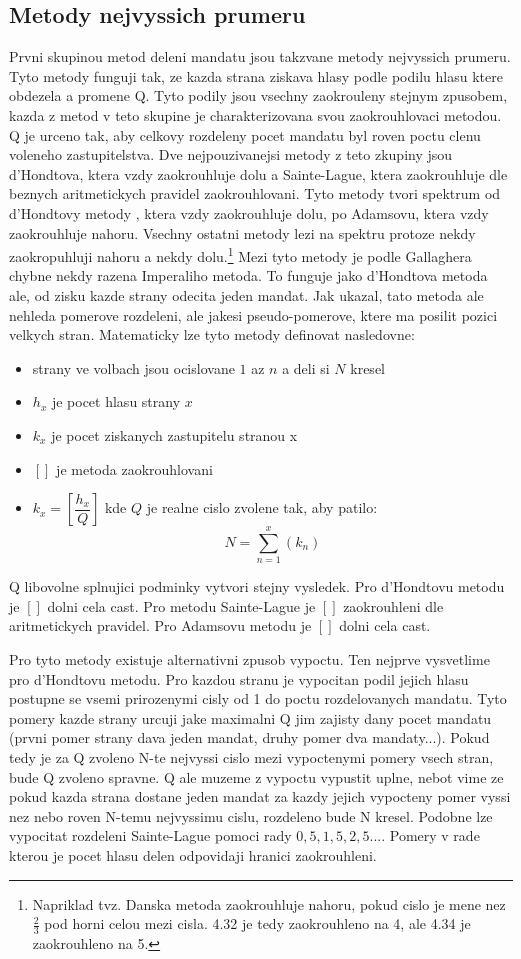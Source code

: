 \documentclass[12pt,a4paper]{scrreprt}
\begin{document}
\subsection{Metody nejvyssich prumeru}
Prvni skupinou metod deleni mandatu jsou takzvane metody nejvyssich prumeru.
Tyto metody funguji tak, ze kazda strana ziskava hlasy podle podilu hlasu ktere obdezela a promene Q.
Tyto podily jsou vsechny zaokrouleny stejnym zpusobem, kazda z metod v teto skupine je charakterizovana svou zaokrouhlovaci metodou.
Q je urceno tak, aby celkovy rozdeleny pocet mandatu byl roven poctu clenu voleneho zastupitelstva.
Dve nejpouzivanejsi metody z teto zkupiny jsou d'Hondtova, ktera vzdy zaokrouhluje dolu a Sainte-Lague, ktera zaokrouhluje dle beznych aritmetickych pravidel zaokrouhlovani.
Tyto metody tvori spektrum od d'Hondtovy metody , ktera vzdy zaokrouhluje dolu, po Adamsovu, ktera vzdy zaokrouhluje nahoru.
Vsechny ostatni metody lezi na spektru protoze nekdy zaokropuhluji nahoru a nekdy dolu.\footnote{Napriklad tvz. Danska metoda zaokrouhluje nahoru, pokud cislo je mene nez $\frac{2}{3}$ pod horni celou mezi cisla. 4.32 je tedy zaokrouhleno na 4, ale 4.34 je zaokrouhleno na 5.} 
Mezi tyto metody je podle Gallaghera chybne nekdy razena Imperaliho metoda.
To funguje jako d'Hondtova metoda ale, od zisku kazde strany odecita jeden mandat.
Jak ukazal, tato metoda ale nehleda pomerove rozdeleni, ale jakesi pseudo-pomerove, ktere ma posilit pozici velkych stran.
\autocite{GAL1}
\newpage
Matematicky lze tyto metody definovat nasledovne:
\begin{itemize}
\item strany ve volbach jsou ocislovane $1$ az $n$ a deli si $N$ kresel
\item $h_{x}$ je pocet hlasu strany $x$
\item $k_{x}$ je pocet ziskanych zastupitelu stranou x
\item $[ ]$ je metoda zaokrouhlovani
\item $k_{x}=[\dfrac{h_{x}}{Q}]$ kde $Q$ je realne cislo zvolene tak, aby patilo: $$N=\sum_{n=1}^{x} (k_{n})$$
\end{itemize}
Q libovolne splnujici podminky vytvori stejny vysledek.
Pro d'Hondtovu metodu je $[ ]$ dolni cela cast.
Pro metodu Sainte-Lague je $[ ]$ zaokrouhleni dle aritmetickych pravidel.
Pro Adamsovu metodu je $[ ]$ dolni cela cast.

Pro tyto metody existuje alternativni zpusob vypoctu.
Ten nejprve vysvetlime pro d'Hondtovu metodu.
Pro kazdou stranu je vypocitan podil jejich hlasu postupne se vsemi prirozenymi cisly od 1 do poctu rozdelovanych mandatu.
Tyto pomery kazde strany urcuji jake maximalni Q jim zajisty dany pocet mandatu (prvni pomer strany dava jeden mandat, druhy pomer dva mandaty...).
Pokud tedy je za Q zvoleno N-te nejvyssi cislo mezi vypoctenymi pomery vsech stran, bude Q zvoleno spravne.
Q ale muzeme z vypoctu vypustit uplne, nebot vime ze pokud kazda strana dostane jeden mandat za kazdy jejich vypocteny pomer vyssi nez nebo roven N-temu nejvyssimu cislu, rozdeleno bude N kresel.
Podobne lze vypocitat rozdeleni Sainte-Lague pomoci rady $0{,}5, 1{,}5, 2{,}5...$.
Pomery v rade kterou je pocet hlasu delen odpovidaji hranici zaokrouhleni.
\end{document}
